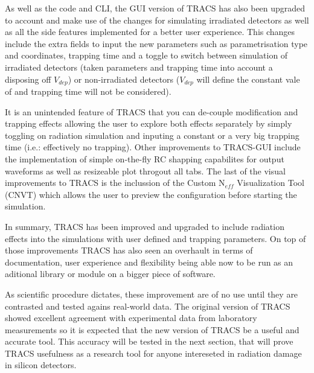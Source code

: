 As well as the code and CLI, the GUI version of TRACS has also been upgraded to account and make use of the changes for simulating irradiated detectors as well as all the side features implemented for a better user experience. This changes include the extra fields to input the new parameters such as \neff parametrisation type and coordinates, trapping time and a toggle to switch between simulation of irradiated detectors (taken \neff parameters and trapping time into account a disposing off $V_{dep}$) or non-irradiated detectors ($V_{dep}$ will define the constant vale of \neff and trapping time will not be considered). 

It is an unintended feature of TRACS that you can de-couple \neff modification and trapping effects allowing the user to explore both effects separately by simply toggling on radiation simulation and inputing a constant \neff or a very big trapping time (i.e.: effectively no trapping). Other improvements to TRACS-GUI include the implementation of simple on-the-fly RC shapping capabilites for output waveforms as well as resizeable plot throgout all tabs. The last of the visual improvements to TRACS is the inclussion of the Custom N$_{eff}$ Visualization Tool (CNVT) which allows the user to preview the \neff configuration before starting the simulation.

In summary, TRACS has been improved and upgraded to include radiation effects into the simulations with user defined \neff and trapping parameters. On top of those improvements TRACS has also seen an overhault in terms of documentation, user experience and flexibility being able now to be run as an aditional library or module on a bigger piece of software.

As scientific procedure dictates, these improvement are of no use until they are contrasted and tested agains real-world data. The original version of TRACS showed excellent agreement with experimental data from laboratory measurements so it is expected that the new version of TRACS be a useful and accurate tool. This accuracy will be tested in the next section, that will prove TRACS usefulness as a research tool for anyone intereseted in radiation damage in silicon detectors.


